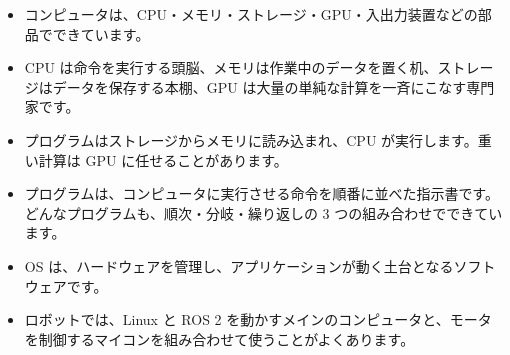 \begin{itemize}
  \item コンピュータは、CPU・メモリ・ストレージ・GPU・入出力装置などの部品でできています。
  \item CPU は命令を実行する頭脳、メモリは作業中のデータを置く机、ストレージはデータを保存する本棚、GPU は大量の単純な計算を一斉にこなす専門家です。
  \item プログラムはストレージからメモリに読み込まれ、CPU が実行します。重い計算は GPU に任せることがあります。
  \item プログラムは、コンピュータに実行させる命令を順番に並べた指示書です。どんなプログラムも、順次・分岐・繰り返しの 3 つの組み合わせでできています。
  \item OS は、ハードウェアを管理し、アプリケーションが動く土台となるソフトウェアです。
  \item ロボットでは、Linux と ROS 2 を動かすメインのコンピュータと、モータを制御するマイコンを組み合わせて使うことがよくあります。
\end{itemize}

